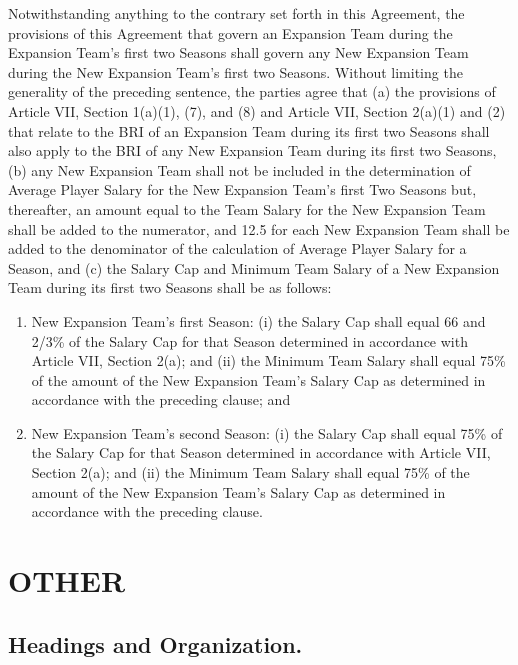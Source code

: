 \documentclass[
]{book}
\providecommand{\tightlist}{%
  \setlength{\itemsep}{0pt}\setlength{\parskip}{0pt}}
\begin{document}
Notwithstanding anything to the contrary set forth in this Agreement, the provisions of this Agreement that govern an Expansion Team during the Expansion Team's first two Seasons shall govern any New Expansion Team during the New Expansion Team's first two Seasons. Without limiting the generality of the preceding sentence, the parties agree that (a) the provisions of Article VII, Section 1(a)(1), (7), and (8) and Article VII, Section 2(a)(1) and (2) that relate to the BRI of an Expansion Team during its first two Seasons shall also apply to the BRI of any New Expansion Team during its first two Seasons, (b) any New Expansion Team shall not be included in the determination of Average Player Salary for the New Expansion Team's first Two Seasons but, thereafter, an amount equal to the Team Salary for the New Expansion Team shall be added to the numerator, and 12.5 for each New Expansion Team shall be added to the denominator of the calculation of Average Player Salary for a Season, and (c) the Salary Cap and Minimum Team Salary of a New Expansion Team during its first two Seasons shall be as follows:

\begin{enumerate}
\def\labelenumi{(\alph{enumi})}
\tightlist
\item
  New Expansion Team's first Season: (i) the Salary Cap shall equal 66 and 2/3\% of the Salary Cap for that Season determined in accordance with Article VII, Section 2(a); and (ii) the Minimum Team Salary shall equal 75\% of the amount of the New Expansion Team's Salary Cap as determined in accordance with the preceding clause; and
\item
  New Expansion Team's second Season: (i) the Salary Cap shall equal 75\% of the Salary Cap for that Season determined in accordance with Article VII, Section 2(a); and (ii) the Minimum Team Salary shall equal 75\% of the amount of the New Expansion Team's Salary Cap as determined in accordance with the preceding clause.
\end{enumerate}

\hypertarget{other}{%
\chapter{OTHER}\label{other}}

\hypertarget{headings-and-organization.}{%
\section{Headings and Organization.}\label{headings-and-organization.}}
\end{document}
